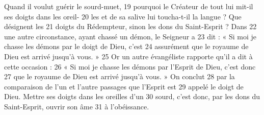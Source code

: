 Quand il voulut guérir le sourd-muet,	 
19	 	pourquoi le Créateur de tout lui mit-il ses doigts dans les oreil-	 
20	 	les et de sa salive lui toucha-t-il la langue ? Que désignent les	 
21	 	doigts du Rédempteur, sinon les dons du Saint-Esprit ? Dans	 
22	 	une autre circonstance, ayant chassé un démon, le Seigneur a	 
23	 	dit : « Si moi je chasse les démons par le doigt de Dieu, c'est	 
24	 	assurément que le royaume de Dieu est arrivé jusqu'à vous. »	 
25	 	Or un autre évangéliste rapporte qu'il a dit à cette occasion :	 
26	 	« Si moi je chasse les démons par l'Esprit de Dieu, c'est donc	 
27	 	que le royaume de Dieu est arrivé jusqu'à vous. » On conclut	 
28	 	par la comparaison de l'un et l'autre passages que l'Esprit est	 
29	 	appelé le doigt de Dieu. Mettre ses doigts dans les oreilles d'un	 
30	 	sourd, c'est donc, par les dons du Saint-Esprit, ouvrir son âme	 
31	 	à l'obéissance.